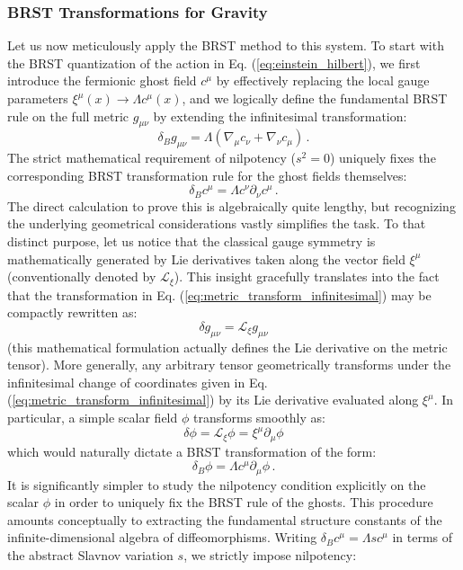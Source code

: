\subsubsection{BRST Transformations for Gravity}

Let us now meticulously apply the BRST method to this system. To start with the BRST quantization of the action in Eq. (\ref{eq:einstein_hilbert}), we first introduce the fermionic ghost field \(c^\mu\) by effectively replacing the local gauge parameters \(\xi^\mu(x) \rightarrow \Lambda c^\mu(x)\), and we logically define the fundamental BRST rule on the full metric \(g_{\mu\nu}\) by extending the infinitesimal transformation:
\begin{equation} \label{eq:brst_metric}
    \delta_B g_{\mu\nu} = \Lambda(\nabla_\mu c_\nu + \nabla_\nu c_\mu) \, .
\end{equation}
The strict mathematical requirement of nilpotency (\(s^2 = 0\)) uniquely fixes the corresponding BRST transformation rule for the ghost fields themselves:
\begin{equation} \label{eq:brst_ghost}
    \delta_B c^\mu = \Lambda c^\nu \partial_\nu c^\mu \, .
\end{equation}
The direct calculation to prove this is algebraically quite lengthy, but recognizing the underlying geometrical considerations vastly simplifies the task. To that distinct purpose, let us notice that the classical gauge symmetry is mathematically generated by Lie derivatives taken along the vector field \(\xi^\mu\) (conventionally denoted by \(\mathcal{L}_\xi\)). This insight gracefully translates into the fact that the transformation in Eq. (\ref{eq:metric_transform_infinitesimal}) may be compactly rewritten as:
\[
    \delta g_{\mu\nu} = \mathcal{L}_\xi g_{\mu\nu}
\]
(this mathematical formulation actually defines the Lie derivative on the metric tensor). More generally, any arbitrary tensor geometrically transforms under the infinitesimal change of coordinates given in Eq. (\ref{eq:metric_transform_infinitesimal}) by its Lie derivative evaluated along \(\xi^\mu\). In particular, a simple scalar field \(\phi\) transforms smoothly as:
\[
    \delta\phi = \mathcal{L}_\xi \phi = \xi^\mu \partial_\mu \phi
\]
which would naturally dictate a BRST transformation of the form:
\[
    \delta_B \phi = \Lambda c^\mu \partial_\mu \phi \, .
\]
It is significantly simpler to study the nilpotency condition explicitly on the scalar \(\phi\) in order to uniquely fix the BRST rule of the ghosts. This procedure amounts conceptually to extracting the fundamental structure constants of the infinite-dimensional algebra of diffeomorphisms. Writing \(\delta_B c^\mu = \Lambda s c^\mu\) in terms of the abstract Slavnov variation \(s\), we strictly impose nilpotency:
